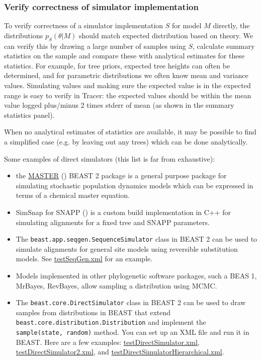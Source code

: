 \documentclass[oneside]{article}
\begin{document}
\subsubsection{Verify correctness of simulator implementation}\label{verify-correctness-of-simulator-implementation}

To verify correctness of a simulator implementation \(S\) for model
\(M\) directly, the distributions \(p_S(\theta|M)\) should match
expected distribution based on theory. We can verify this by drawing a
large number of samples using \(S\), calculate summary statistics on the
sample and compare these with analytical estimates for these statistics.
For example, for tree priors, expected tree heights can often be determined, and for parametric distributions we often know mean and variance values. Simulating values and making sure the expected value is in the expected range is easy to verify in Tracer: the expected values should be within the mean value logged plus/minus 2 times stderr of mean (as shown in the summary statistics panel).

When no analytical estimates of statistics are available, it may be possible to find a simplified case (e.g. by leaving out any trees) which can be done analytically.

Some examples of direct simulators (this list is far from exhaustive):

\begin{itemize}
\item
  the \href{http://tgvaughan.github.io/MASTER/}{MASTER} (\cite{vaughan2013stochastic}) 
  BEAST 2 package is a general purpose package for
  simulating stochastic population dynamics models which can be
  expressed in terms of a chemical master equation.
\item
  SimSnap for SNAPP (\cite{bryant2012inferring}) is a custom build
  implementation in C++ for simulating alignments for a fixed tree and
  SNAPP parameters.
\item
  The \texttt{beast.app.seqgen.SequenceSimulator} class in BEAST 2 can
  be used to simulate alignments for general site models using
  reversible substitution models. See
  \href{https://github.com/CompEvol/beast2/blob/master/examples/testSeqGen.xml}{testSeqGen.xml}
  for an example.
\item
  Models implemented in other phylogenetic software packages, such a
  BEAS 1, MrBayes, RevBayes, allow sampling a distribution using MCMC.
\item
  The \texttt{beast.core.DirectSimulator} class in BEAST 2 can be used
  to draw samples from distributions in BEAST that extend
  \texttt{beast.core.distribution.Distribution} and implement the
  \texttt{sample(state,\ random)} method. You can set up an XML file and
  run it in BEAST. Here are a few examples:
  \href{https://github.com/CompEvol/beast2/blob/master/examples/testDirectSimulator.xml}{testDirectSimulator.xml},
  \href{https://github.com/CompEvol/beast2/blob/master/examples/testDirectSimulator2.xml}{testDirectSimulator2.xml},
  and
  \href{https://github.com/CompEvol/beast2/blob/master/examples/testDirectSimulatorHierarchical.xml}{testDirectSimulatorHierarchical.xml}.
\end{itemize}
\end{document}
